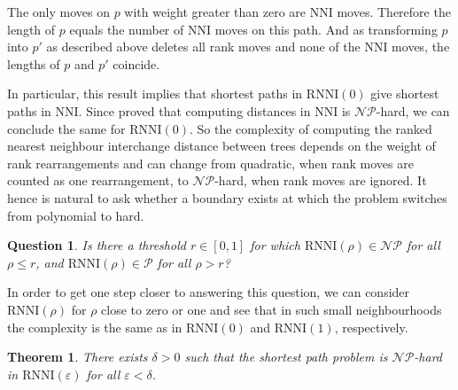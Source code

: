 \documentclass[11pt]{amsart}
\newtheorem{theorem}{Theorem}
\newtheorem{question}{Question}
\newcommand{\rnni}{\mathrm{RNNI}}
\newcommand{\nni}{\mathrm{NNI}}
\newcommand{\np}{\mathcal{NP}}
\newcommand{\p}{\mathcal{P}}
\newcommand{\summary}[1]{} %
\begin{document}
\proof
The only moves on $p$ with weight greater than zero are $\nni$ moves.
Therefore the length of $p$ equals the number of $\nni$ moves on this path.
And as transforming $p$ into $p'$ as described above deletes all rank moves and none of the $\nni$ moves, the lengths of $p$ and $p'$ coincide.
\endproof

\summary{Complexity of $\rnni(\rho)$ changes somewhere between zero and one -- where remains an open question}
In particular, this result implies that shortest paths in $\rnni(0)$ give shortest paths in $\nni$.
Since \textcite{Dasgupta2000-xa} proved that computing distances in $\nni$ is $\np$-hard, we can conclude the same for $\rnni(0)$.
So the complexity of computing the ranked nearest neighbour interchange distance between trees depends on the weight of rank rearrangements and can change from quadratic, when rank moves are counted as one rearrangement, to $\np$-hard, when rank moves are ignored.
It hence is natural to ask whether a boundary exists at which the problem switches from polynomial to hard.

\begin{question}
Is there a threshold $r \in [0,1]$ for which $\rnni(\rho) \in \np$ for all $\rho \leq r$, and $\rnni(\rho) \in \p$ for all $\rho > r$?
\end{question}

\summary{Getting one step closer to answer this question by considering small neighbourhoods for $\rho$ around zero and one}
In order to get one step closer to answering this question, we can consider $\rnni(\rho)$ for $\rho$ close to zero or one and see that in such small neighbourhoods the complexity is the same as in $\rnni(0)$ and $\rnni(1)$, respectively.

\begin{theorem}
There exists $\delta > 0$ such that the shortest path problem is $\np$-hard in $\rnni(\varepsilon)$ for all $\varepsilon < \delta$.
\label{thm:complexity_around_nni}
\end{theorem}
\end{document}
